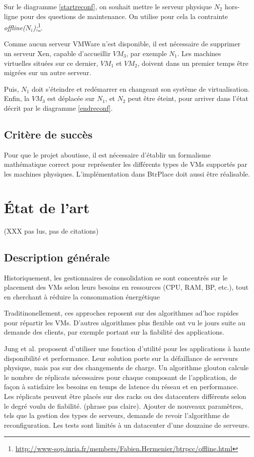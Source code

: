 \documentclass[a4paper]{article}
\begin{document}
Sur le diagramme \ref{startreconf}, on souhait mettre le serveur physique
$N_2$ hors-ligne pour des questions de maintenance. On utilise pour cela
la contrainte \textit{offline($N_i$);}\footnote{\url{http://www-sop.inria.fr/members/Fabien.Hermenier/btrpcc/offline.html}}.

Comme aucun serveur VMWare n'est disponible, il est nécessaire de supprimer
un serveur Xen, capable d'accueillir $VM_3$, par exemple $N_1$. Les machines
virtuelles situées sur ce dernier, $VM_1$ et $VM_2$,  doivent dans un premier
temps être migrées sur un autre serveur.

Puis, $N_1$ doit s'éteindre et redémarrer en changeant son système
de virtualisation. Enfin, la $VM_3$ est déplacée sur $N_1$, et $N_2$ peut
être éteint, pour arriver dans l'état décrit par le diagramme \ref{endreconf}.

\subsection{Critère de succès}
Pour que le projet aboutisse, il est nécessaire d'établir un
formalisme mathématique correct pour représenter les différents
types de VMs supportés par les machines physiques. L'implémentation
dans BtrPlace doit aussi être réalisable.

\section{État de l'art}
(XXX pas lus, pas de citations)
\subsection{Description générale}
Historiquement, les gestionnaires de consolidation se sont concentrés sur
le placement des VMs selon leurs besoins en ressources (CPU, RAM, BP, etc.),
tout en cherchant à réduire la consommation énergétique

Traditinonellement, ces approches reposent sur des algorithmes ad'hoc rapides
pour répartir les VMs. D'autres algorithmes plus flexible ont vu le jours
suite au demande des clients, par exemple portant sur la fiabilité des
applications.

Jung et al. proposent d'utiliser une fonction d'utilité pour les
applications à haute disponibilité et performance. Leur solution
porte sur la défaillance de serveurs physique, mais pas sur des
changements de charge. Un algorithme glouton calcule le nombre de
réplicats nécessaires pour chaque composant de l'application, de
façon à satisfaire les besoins en temps de latence du réseau et
en performance. Les réplicats peuvent être placés sur des racks
ou des datacenters différents selon le degré voulu de fiabilité.
(phrase pas claire). Ajouter de nouveaux paramètres, tels que la
gestion des types de serveurs, demande de revoir l'algorithme
de reconfiguration. Les tests sont limités à un datacenter d'une
douzaine de serveurs.
\end{document}
